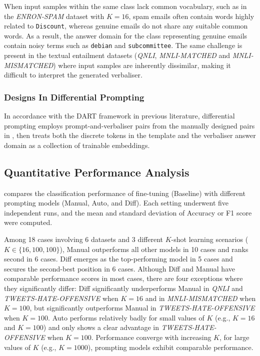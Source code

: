 When input samples within the same class lack common vocabulary, such as in the \textit{ENRON-SPAM} dataset with $K = 16$, spam emails often contain words highly related to \texttt{Discount}, whereas genuine emails do not share any suitable common words. As a result, the answer domain for the class representing genuine emails contain noisy terms such as \texttt{debian} and \texttt{subcommittee}. The same challenge is present in the textual entailment datasets (\textit{QNLI}, \textit{MNLI-MATCHED} and \textit{MNLI-MISMATCHED}) where input samples are inherently dissimilar, making it difficult to interpret the generated verbaliser.

\subsubsection{Designs In Differential Prompting}
In accordance with the DART framework \cite{zhang2021differentiable} in previous literature, differential prompting employs prompt-and-verbaliser pairs from the manually designed pairs in , then treats both the discrete tokens in the template and the verbaliser answer domain as a collection of trainable embeddings.

\subsection{Quantitative Performance Analysis}
 compares the classification performance of fine-tuning (Baseline) with different prompting models (Manual, Auto, and Diff). Each setting underwent five independent runs, and the mean and standard deviation of Accuracy or F1 score were computed.

Among 18 cases involving 6 datasets and 3 different $K$-shot learning scenarios ($K \in \{16, 100, 100\}$), Manual outperforms all other models in 10 cases and ranks second in 6 cases. Diff emerges as the top-performing model in 5 cases and secures the second-best position in 6 cases. Although Diff and Manual have comparable performance scores in most cases, there are four exceptions where they significantly differ: Diff significantly underperforms Manual in \textit{QNLI} and \textit{TWEETS-HATE-OFFENSIVE} when $K = 16$ and in \textit{MNLI-MISMATCHED} when $K = 100$, but significantly outperforms Manual in \textit{TWEETS-HATE-OFFENSIVE} when $K = 100$. Auto performs relatively badly for small values of $K$ (e.g., $K = 16$ and $K = 100$) and only shows a clear advantage in \textit{TWEETS-HATE-OFFENSIVE} when $K = 100$. Performance converge with increasing $K$, for large values of $K$ (e.g., $K=1000$), prompting models exhibit comparable performance.  

